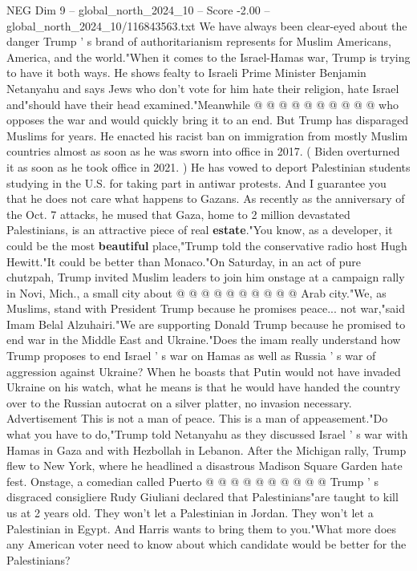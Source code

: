 \begin{textsample}{NEG Dim 9 – global\_north\_2024\_10 – Score -2.00 – global\_north\_2024\_10/116843563.txt}
We have always been clear-eyed about the danger Trump ' s brand of authoritarianism represents for Muslim Americans, America, and the world."When it comes to the Israel-Hamas war, Trump is trying to have it both ways.
He shows fealty to Israeli Prime Minister Benjamin Netanyahu and says Jews who don't vote for him hate their religion, hate Israel and"should have their head examined."Meanwhile @ @ @ @ @ @ @ @ @ @ who opposes the war and would quickly bring it to an end.
But Trump has disparaged Muslims for years.
He enacted his racist ban on immigration from mostly Muslim countries almost as soon as he was sworn into office in 2017. ( Biden overturned it as soon as he took office in 2021. ) He has vowed to deport Palestinian students studying in the U.S. for taking part in antiwar protests.
And I guarantee you that he does not care what happens to Gazans.
As recently as the anniversary of the Oct. 7 attacks, he mused that Gaza, home to 2 million devastated Palestinians, is an attractive piece of real \textbf{estate}."You know, as a developer, it could be the most \textbf{beautiful} place,"Trump told the conservative radio host Hugh Hewitt."It could be better than Monaco."On Saturday, in an act of pure chutzpah, Trump invited Muslim leaders to join him onstage at a campaign rally in Novi, Mich., a small city about @ @ @ @ @ @ @ @ @ @ Arab city."We, as Muslims, stand with President Trump because he promises peace... not war,"said Imam Belal Alzuhairi."We are supporting Donald Trump because he promised to end war in the Middle East and Ukraine."Does the imam really understand how Trump proposes to end Israel ' s war on Hamas as well as Russia ' s war of aggression against Ukraine?
When he boasts that Putin would not have invaded Ukraine on his watch, what he means is that he would have handed the country over to the Russian autocrat on a silver platter, no invasion necessary.
Advertisement This is not a man of peace.
This is a man of appeasement."Do what you have to do,"Trump told Netanyahu as they discussed Israel ' s war with Hamas in Gaza and with Hezbollah in Lebanon.
After the Michigan rally, Trump flew to New York, where he headlined a disastrous Madison Square Garden hate fest.
Onstage, a comedian called Puerto @ @ @ @ @ @ @ @ @ @ Trump ' s disgraced consigliere Rudy Giuliani declared that Palestinians"are taught to kill us at 2 years old.
They won't let a Palestinian in Jordan.
They won't let a Palestinian in Egypt.
And Harris wants to bring them to you."What more does any American voter need to know about which candidate would be better for the Palestinians?

\end{textsample}
